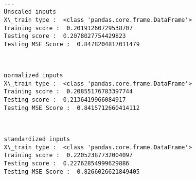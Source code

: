 \documentclass[11pt]{article}
\begin{document}
    \begin{center}
    \end{center}
    { \hspace*{\fill} \\}
    
    \begin{Verbatim}[commandchars=\\\{\}]
---
Unscaled inputs
X\_train type :  <class 'pandas.core.frame.DataFrame'>
Training score :  0.20191260729538707
Testing score :  0.2078027754429823
Testing MSE Score :  0.8478204817011479

    \end{Verbatim}

    \begin{center}
    \end{center}
    { \hspace*{\fill} \\}
    
    \begin{Verbatim}[commandchars=\\\{\}]
normalized inputs
X\_train type :  <class 'pandas.core.frame.DataFrame'>
Training score :  0.20855176783397744
Testing score :  0.2136419966084917
Testing MSE Score :  0.8415712660414112

    \end{Verbatim}

    \begin{center}
    \end{center}
    { \hspace*{\fill} \\}
    
    \begin{Verbatim}[commandchars=\\\{\}]
standardized inputs
X\_train type :  <class 'pandas.core.frame.DataFrame'>
Training score :  0.22052387732004097
Testing score :  0.22762854999629886
Testing MSE Score :  0.8266026621849405

    \end{Verbatim}

    \begin{center}
    \end{center}
    { \hspace*{\fill} \\}
    
\end{document}
